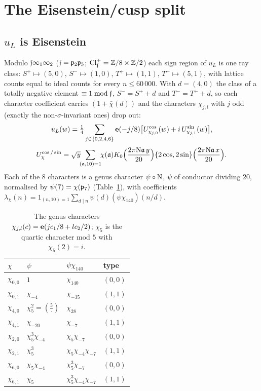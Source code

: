 \section{The Eisenstein/cusp split}\label{sec:split}

\subsection{$u_L$ is Eisenstein}\label{sec:uLeis}
Modulo $\mathfrak{f}\infty_1\infty_2$ ($\mathfrak{f}=\mathfrak{p}_2\mathfrak{p}_5$; $\mathrm{Cl}^+_{\mathfrak{f}}=\mathbb{Z}/8\times\mathbb{Z}/2$) each sign region of $u_L$ is one ray class:
$S^+\mapsto(5,0)$, $S^-\mapsto(1,0)$, $T^+\mapsto(1,1)$, $T^-\mapsto(5,1)$, with lattice counts equal to ideal counts for every $n\le60\,000$. With $d=(4,0)$ the class of a totally negative element $\equiv1\bmod\mathfrak{f}$, $S^-=S^++d$ and $T^-=T^++d$, so each character
coefficient carries $(1+\bar\chi(d))$ and the characters $\chi_{j,l}$ with $j$ odd (exactly the non-$\sigma$-invariant ones) drop out:
\[
u_L(w)=\tfrac14\sum_{j\in\{0,2,4,6\}}\mathbf{e}(-j/8)\bigl[U^{\cos}_{\chi_{j,0}}(w)+i\,U^{\sin}_{\chi_{j,1}}(w)\bigr],\]
\[
U^{\cos/\sin}_\chi=\sqrt y\!\!\sum_{(\mathfrak{a},10)=1}\!\!\chi(\mathfrak{a})K_0\Bigl(\frac{2\pi\mathrm{N}\mathfrak{a}\,y}{20}\Bigr)\{2\cos,2\sin\}\Bigl(\frac{2\pi\mathrm{N}\mathfrak{a}\,x}{20}\Bigr).
\]
Each of the $8$ characters is a genus character $\psi\circ\mathrm{N}$, $\psi$ of conductor dividing $20$, normalised by $\psi(7)=\chi(\mathfrak{p}_7)$
(Table~\ref{tab:genus}), with coefficients $\lambda_\chi(n)=1_{(n,10)=1}\sum_{d\mid n}\psi(d)(\psi\chi_{140})(n/d)$.
\begin{table}[ht]\centering\small
\begin{tabular}{llll}\toprule
$\chi$ & $\psi$ & $\psi\chi_{140}$ & type\\\midrule
$\chi_{0,0}$ & $1$ & $\chi_{140}$ & $(0,0)$\\
$\chi_{0,1}$ & $\chi_{-4}$ & $\chi_{-35}$ & $(1,1)$\\
$\chi_{4,0}$ & $\chi_5^2=(\tfrac5\cdot)$ & $\chi_{28}$ & $(0,0)$\\
$\chi_{4,1}$ & $\chi_{-20}$ & $\chi_{-7}$ & $(1,1)$\\
$\chi_{2,0}$ & $\chi_5^3\chi_{-4}$ & $\chi_5\chi_{-7}$ & $(0,0)$\\
$\chi_{2,1}$ & $\chi_5^3$ & $\chi_5\chi_{-4}\chi_{-7}$ & $(1,1)$\\
$\chi_{6,0}$ & $\chi_5\chi_{-4}$ & $\chi_5^3\chi_{-7}$ & $(0,0)$\\
$\chi_{6,1}$ & $\chi_5$ & $\chi_5^3\chi_{-4}\chi_{-7}$ & $(1,1)$\\\bottomrule
\end{tabular}
\caption{The genus characters $\chi_{j,l}(c)=\mathbf{e}(jc_1/8+lc_2/2)$; $\chi_5$ is the quartic character mod $5$ with $\chi_5(2)=i$.}\label{tab:genus}
\end{table}
